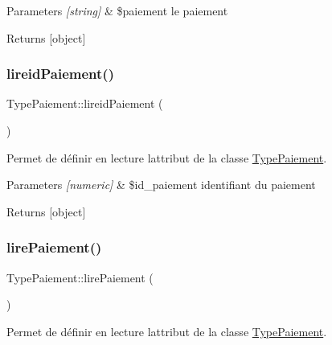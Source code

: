 \begin{DoxyParams}{Parameters}
{\em \mbox{[}string\mbox{]}} & \$paiement le paiement \\
\hline
\end{DoxyParams}
\begin{DoxyReturn}{Returns}
\mbox{[}object\mbox{]} 
\end{DoxyReturn}
\mbox{\label{class_type_paiement_a3002d7b5485b1c7bdefa9836868fe8cb}} 
\subsubsection{\texorpdfstring{lireid\+Paiement()}{lireidPaiement()}}
{\footnotesize\ttfamily Type\+Paiement\+::lireid\+Paiement (\begin{DoxyParamCaption}{ }\end{DoxyParamCaption})}



Permet de définir en lecture l\textquotesingle{}attribut de la classe \hyperlink{class_type_paiement}{Type\+Paiement}. 


\begin{DoxyParams}{Parameters}
{\em \mbox{[}numeric\mbox{]}} & \$id\+\_\+paiement identifiant du paiement \\
\hline
\end{DoxyParams}
\begin{DoxyReturn}{Returns}
\mbox{[}object\mbox{]} 
\end{DoxyReturn}
\mbox{\label{class_type_paiement_a8416195716d64a596dc655f94e0b57f8}} 
\subsubsection{\texorpdfstring{lire\+Paiement()}{lirePaiement()}}
{\footnotesize\ttfamily Type\+Paiement\+::lire\+Paiement (\begin{DoxyParamCaption}{ }\end{DoxyParamCaption})}



Permet de définir en lecture l\textquotesingle{}attribut de la classe \hyperlink{class_type_paiement}{Type\+Paiement}. 


